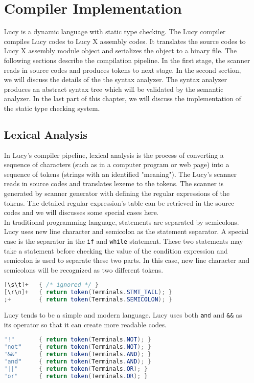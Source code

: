 \chapter{Compiler Implementation}
Lucy is a dynamic language with static type checking. The Lucy compiler compiles Lucy codes to Lucy X assembly codes. It translates the source codes to Lucy X assembly module object and serializes the object to a binary file. The following sections describe the compilation pipeline. In the first stage, the scanner reads in source codes and produces tokens to next stage. In the second section, we will discuss the details of the the syntax analyzer. The syntax analyzer produces an abstract syntax tree which will be validated by the semantic analyzer. In the last part of this chapter, we will discuss the implementation of the static type checking system.


\section{Lexical Analysis}
In Lucy's compiler pipeline, lexical analysis is the process of converting a sequence of characters (such as in a computer program or web page) into a sequence of tokens (strings with an identified "meaning"). The Lucy's scanner reads in source codes and translates lexeme to the tokens. The scanner is generated by scanner generator with defining the regular expressions of the tokens. The detailed regular expression's table can be retrieved in the source codes and we will discusses some special cases here. \\
In traditional programming language, statements are separated by semicolons. Lucy uses new line character and semicolon as the statement separator. A special case is the separator in the \texttt{if} and \texttt{while} statement. These two statements may take a statement before checking the value of the condition expression and semicolon is used to separate these two parts. In this case, new line character and semicolons will be recognized as two different tokens.
\begin{lstlisting}[language=java]
[\s\t]+   { /* ignored */ }
[\r\n]+   { return token(Terminals.STMT_TAIL); }
;+        { return token(Terminals.SEMICOLON); }
\end{lstlisting}
Lucy tends to be a simple and modern language. Lucy uses both \texttt{and} and \texttt{\&\&} as its operator so that it can create more readable codes.
\begin{lstlisting}[language=java]
"!"       { return token(Terminals.NOT); }
"not"     { return token(Terminals.NOT); }
"&&"      { return token(Terminals.AND); }
"and"     { return token(Terminals.AND); }
"||"      { return token(Terminals.OR); }
"or"      { return token(Terminals.OR); }
\end{lstlisting}


